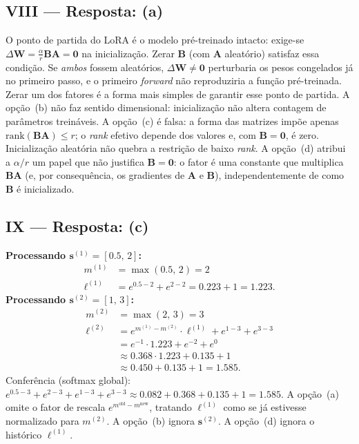 \documentclass{dlproblemset}
\begin{document}
\subsection*{VIII — Resposta: (a)}
O ponto de partida do LoRA é o modelo pré-treinado intacto: exige-se
$\Delta\mathbf{W} = \tfrac{\alpha}{r}\mathbf{B}\mathbf{A} = \mathbf{0}$ na inicialização. Zerar $\mathbf{B}$ (com $\mathbf{A}$
aleatório) satisfaz essa condição. Se \emph{ambos} fossem aleatórios,
$\Delta\mathbf{W} \neq \mathbf{0}$ perturbaria os pesos congelados já no primeiro passo, e
o primeiro \textit{forward} não reproduziria a função pré-treinada. Zerar um dos
fatores é a forma mais simples de garantir esse ponto de partida.
A opção~(b) não faz sentido dimensional: inicialização não altera contagem
de parâmetros treináveis.
A opção~(c) é falsa: a forma das matrizes impõe apenas $\mathrm{rank}(\mathbf{B}\mathbf{A}) \le r$;
o \textit{rank} efetivo depende dos valores e, com $\mathbf{B} = \mathbf{0}$, é zero.
Inicialização aleatória não quebra a restrição de baixo \textit{rank}.
A opção~(d) atribui a $\alpha/r$ um papel que não justifica $\mathbf{B} = \mathbf{0}$:
o fator é uma constante que multiplica $\mathbf{B}\mathbf{A}$ (e, por consequência, os
gradientes de $\mathbf{A}$ e $\mathbf{B}$), independentemente de como $\mathbf{B}$ é inicializado.

\subsection*{IX — Resposta: (c)}
\textbf{Processando $\mathbf{s}^{(1)} = [0.5,\,2]$:}
\begin{align*}
  m^{(1)} &= \max(0.5,\,2) = 2 \\
  \ell^{(1)} &= e^{0.5-2} + e^{2-2} = 0.223 + 1 = 1.223.
\end{align*}
\textbf{Processando $\mathbf{s}^{(2)} = [1,\,3]$:}
\begin{align*}
  m^{(2)} &= \max(2,\,3) = 3 \\
  \ell^{(2)} &= e^{m^{(1)}-m^{(2)}}\cdot \ell^{(1)} + e^{1-3} + e^{3-3} \\
             &= e^{-1}\cdot 1.223 + e^{-2} + e^{0} \\
             &\approx 0.368 \cdot 1.223 + 0.135 + 1 \\
             &\approx 0.450 + 0.135 + 1 = \mathbf{1.585}.
\end{align*}
Conferência (softmax global): $e^{0.5-3}+e^{2-3}+e^{1-3}+e^{3-3}
\approx 0.082 + 0.368 + 0.135 + 1 = 1.585$. \checkmark
A opção~(a) omite o fator de rescala $e^{m^{\text{old}}-m^{\text{new}}}$,
tratando $\ell^{(1)}$ como se já estivesse normalizado para $m^{(2)}$.
A opção~(b) ignora $\mathbf{s}^{(2)}$.
A opção~(d) ignora o histórico $\ell^{(1)}$.
\end{document}
